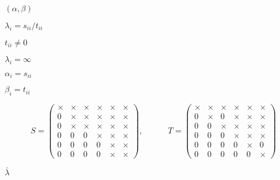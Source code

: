 {\newpage\clearpage
{}%
$(\alpha,\beta)$%
\lthtmlinlinemathZ
\lthtmlcheckvsize\clearpage}

{\newpage\clearpage
{}%
$\lambda_i = s_{ii}/t_{ii}$%
\lthtmlinlinemathZ
\lthtmlcheckvsize\clearpage}

{\newpage\clearpage
{}%
$t_{ii} \neq 0$%
\lthtmlinlinemathZ
\lthtmlcheckvsize\clearpage}

{\newpage\clearpage
{}%
$\lambda_i = \infty$%
\lthtmlinlinemathZ
\lthtmlcheckvsize\clearpage}

{\newpage\clearpage
{}%
$\alpha_i = s_{ii}$%
\lthtmlinlinemathZ
\lthtmlcheckvsize\clearpage}

{\newpage\clearpage
{}%
$\beta_i = t_{ii}$%
\lthtmlinlinemathZ
\lthtmlcheckvsize\clearpage}

{\newpage\clearpage
{}%
\begin{displaymath}
S = \left( \begin{array}{cccccc}
  \times  & \times  & \times  & \times  & \times  & \times   \\
  0 & \times  & \times  & \times  & \times  & \times   \\
  0 & \times  & \times  & \times  & \times  & \times   \\
  0 & 0 & 0 & \times  & \times  & \times   \\
  0 & 0 & 0 & 0 & \times  & \times   \\
  0 & 0 & 0 & 0 & \times  & \times
\end{array} \right), \quad\quad\quad
T = \left( \begin{array}{cccccc}
  \times  & \times  & \times  & \times  & \times  & \times   \\
  0 & \times  & 0  & \times  & \times  & \times   \\
  0 &  0      & \times  & \times  & \times  & \times   \\
  0 & 0 & 0 & \times  & \times  & \times   \\
  0 & 0 & 0 & 0 & \times  & 0        \\
  0 & 0 & 0 & 0 & 0       & \times
\end{array} \right)
\end{displaymath}%
\lthtmldisplayZ
\lthtmlcheckvsize\clearpage}

{\newpage\clearpage
{}%
$\bar{\lambda}$%
\lthtmlinlinemathZ
\lthtmlcheckvsize\clearpage}

